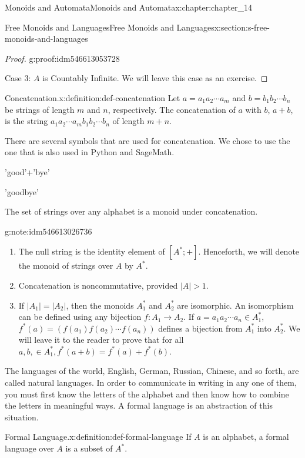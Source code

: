 \documentclass[oneside,10pt,]{book}
\numberwithin{equation}{section}
\begin{document}
\begin{chapterptx}{Monoids and Automata}{}{Monoids and Automata}{}{}{x:chapter:chapter_14}
\begin{sectionptx}{Free Monoids and Languages}{}{Free Monoids and Languages}{}{}{x:section:s-free-monoids-and-languages}
\begin{proof}{}{g:proof:idm546613053728}
\par
Case 3: \(A\) is Countably Infinite. We will leave this case as an exercise.%
\end{proof}
\begin{definition}{Concatenation.}{x:definition:def-concatenation}%
%
\label{g:notation:idm546613034240}%
Let  \(a=a_1a_2\cdots  a_m\) and \(b=b_1b_2\cdots  b_n\) be strings of length \(m\) and \(n\), respectively. The concatenation of \(a\) with \(b\), \(a+b\), is the string \(a_1a_2\cdots  a_mb_1b_2\cdots  b_n\) of length  \(m+n\).%
\end{definition}
There are several symbols that are used for concatenation.  We chose to use the one that is also used in Python and SageMath.%
\begin{sageinput}
'good'+'bye'
\end{sageinput}
\begin{sageoutput}
'goodbye'
\end{sageoutput}
The set of strings over any alphabet is a monoid under concatenation.%
\begin{note}{}{g:note:idm546613026736}%
%
\begin{enumerate}[label=(\alph*)]
\item{}The null string is the identity element of \([A^*; +]\). Henceforth, we will denote the monoid of strings over \(A\) by \(A^*\).%
\item{}Concatenation is noncommutative, provided \(\lvert A\rvert  > 1\).%
\item{}If \(\lvert A_1 \rvert  = \lvert A_2 \rvert\), then the monoids \(A_1^*\) and \(A_2^*\) are isomorphic. An isomorphism can be defined using any bijection \(f:A_1\to A_2\). If \(a=a_1a_2\cdots  a_n \in  A_1^*\), \(f^*(a)=(f(a_1)f(a_2)\cdots  f(a_n))\) defines a bijection from \(A_1^*\) into \(A_2^*\). We will leave it to the reader to prove that for all \(a,b,\in A_1^*,f^*(a+b)=f^*(a)+f^*(b)\).%
\end{enumerate}
%
\end{note}
The languages of the world, English, German, Russian, Chinese, and so forth, are called natural languages. In order to communicate in writing in any one of them, you must first know the letters of the alphabet and then know how to combine the letters in meaningful ways. A  formal language is an abstraction of this situation.%
\begin{definition}{Formal Language.}{x:definition:def-formal-language}%
%
If \(A\) is an alphabet, a formal language over \(A\) is a subset of \(A^*\).%

\end{definition}
\end{sectionptx}
\end{chapterptx}
\end{document}
